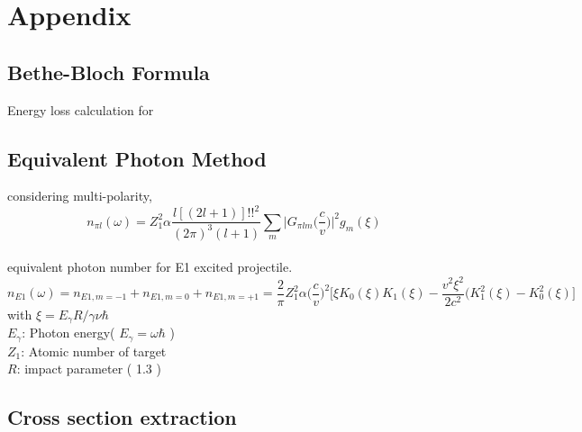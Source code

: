\renewcommand{\thechapter}{A}
\def\theequation{A.\arabic{section}.\arabic{equation}}
\makeatletter
{}
\makeatother
\chapter*{Appendix}


\section{Bethe-Bloch Formula}
Energy loss calculation for 

\section{Equivalent Photon Method}
considering multi-polarity, 
\begin{displaymath}
    n_{\pi l}(\omega)=Z^{2}_{1} \alpha \frac{l[(2l+1)]!!^{2}}{(2\pi)^{3}(l+1)}\sum_{m}\Big|G_{\pi l m}\big( \frac{c}{v}\big) \Big|^{2} g_{m}(\xi)
\end{displaymath} \\
equivalent photon number for E1 excited projectile.
\begin{displaymath}
    n_{E1}(\omega)=n_{E1, m=-1}+n_{E1, m=0}+n_{E1, m=+1}=\frac{2}{\pi}Z^{2}_{1}\alpha\Big(\frac{c}{v}\Big)^{2}\Big[\xi K_{0}(\xi)K_{1}(\xi)-\frac{v^{2}\xi^{2}}{2c^{2}}(K^{2}_{1}(\xi)-K^{2}_{0}(\xi)\Big]
\end{displaymath}
with $\xi=E_{\gamma}R/\gamma \nu \hbar$\\
$E_{\gamma}$: Photon energy( $E_{\gamma}=\omega\hbar$ )\\
$Z_{1}$: Atomic number of target\\
$R$: impact parameter ( 1.3 )\\


\section{Cross section extraction}


